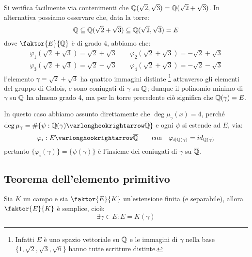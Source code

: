 \documentclass[11pt]{scrartcl}
\begin{document}
\begin{example}
    Si verifica facilmente via contenimenti che $\mathbb Q(\sqrt{2},\sqrt{3}) = \mathbb Q(\sqrt{2} + \sqrt{3})$. In alternativa possiamo osservare che, data la torre:
    \[ \mathbb Q \subseteq \mathbb Q(\sqrt{2} + \sqrt{3}) \subseteq \mathbb Q(\sqrt{2},\sqrt{3}) = E
        \]
    dove $\faktor{E}{\QQ}$ è di grado 4, abbiamo che:
    \begin{align*}
        \varphi_1(\sqrt{2}+\sqrt{3}) = \sqrt{2} + \sqrt{3} \qquad \varphi_2(\sqrt{2}+\sqrt{3}) = -\sqrt{2} + \sqrt{3} \\
	\varphi_3(\sqrt{2}+\sqrt{3}) = \sqrt{2} - \sqrt{3} \qquad \varphi_4(\sqrt{2}+\sqrt{3}) = - \sqrt{2} - \sqrt{3}
    \end{align*}
    l'elemento $\gamma = \sqrt{2}+\sqrt{3}$ ha quattro immagini distinte
    \footnote{Infatti $E$ è uno spazio vettoriale su $\mathbb Q$ e le immagini di $\gamma$ nella base $\{1,\sqrt2,\sqrt3,\sqrt6\}$ hanno tutte scritture distinte.}
    attraverso gli elementi del gruppo di Galois, e sono coniugati di $\gamma$ su $\mathbb Q$;
    dunque il polinomio minimo di $\gamma$ su $\mathbb Q$ ha almeno grado 4, ma per la torre precedente ciò significa che $\mathbb Q(\gamma) = E$.
\end{example}

\begin{remark}
    In questo caso abbiamo assunto direttamente che $\deg \mu_\gamma (x) = 4$, perché $\deg \mu_\gamma = \#\{\psi : \QQ(\gamma) \varlonghookrightarrow \ol\QQ\}$ e ogni $\psi$ si 
    estende ad $E$, via:
    \[ \varphi_i : E \varlonghookrightarrow \ol \QQ \qquad \text{con} \quad \varphi_{i|\QQ(\gamma)} = id_{\QQ(\gamma)}
        \]
    pertanto $\{\varphi_i(\gamma)\} = \{\psi(\gamma)\}$ è l'insieme dei coniugati di $\gamma$ su $\overline {\mathbb Q}$.
\end{remark}

\newpage
\subsection{Teorema dell'elemento primitivo}
\begin{theorem}
    \label{prim}
    Sia $K$ un campo e sia $\faktor{E}{K}$ un'estensione finita (e separabile), allora $\faktor{E}{K}$ è semplice, cioè:
    \[ \exists\gamma \in E : E = K(\gamma)
        \] 
\end{theorem}
\end{document}
